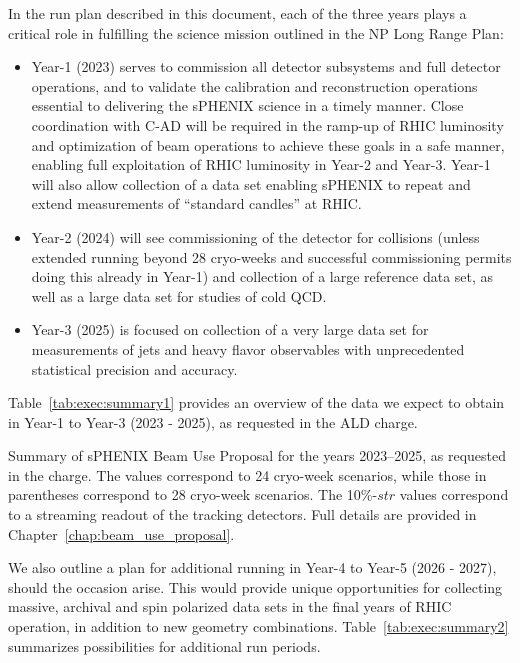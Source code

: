 In the run plan described in this document, each of the three years
plays a critical role in fulfilling the science mission outlined in
the NP Long Range Plan:
\begin{itemize}
\item Year-1 (2023) serves to commission all detector subsystems and full
  detector operations, and to validate the calibration and
  reconstruction operations essential to delivering the sPHENIX
  science in a timely manner. Close coordination with C-AD will be
  required in the ramp-up of RHIC luminosity and optimization of beam
  operations to achieve these goals in a safe manner, enabling full
  exploitation of RHIC luminosity in Year-2 and Year-3. Year-1 will
  also allow collection of a \auau data set enabling sPHENIX to repeat
  and extend measurements of ``standard candles'' at RHIC.
\item Year-2 (2024) will see commissioning of the detector for \pp collisions
  (unless extended running beyond 28 cryo-weeks and successful \auau
  commissioning permits doing this already in Year-1) and collection
  of a large \pp reference data set, as well as a large \pAu data set
  for studies of cold QCD.
\item Year-3 (2025) is focused on collection of a very large \auau
  data set for measurements of jets and heavy flavor observables with
  unprecedented statistical precision and accuracy.
\end{itemize}

Table~\ref{tab:exec:summary1} provides an overview of the data we
expect to obtain in Year-1 to Year-3 (2023 - 2025), as requested in the ALD charge.

\begin{table}[hbt!]
\centering
\caption{\label{tab:exec:summary1} Summary of sPHENIX Beam Use Proposal for the years
  2023--2025, as requested in the charge.  The values correspond to 24 cryo-week scenarios, while those in parentheses correspond to 28 cryo-week scenarios.    The 10\%-$str$ values correspond to a streaming readout of the tracking detectors.
  Full details are provided in
  Chapter~\ref{chap:beam_use_proposal}.} 
\bigskip \centering 
\end{table}

We also outline a plan for additional running in Year-4 to Year-5 (2026 - 2027), should the occasion
arise. This would provide unique opportunities for collecting massive,
archival \apa and spin polarized \pp data sets in the final years of
RHIC operation, in addition to new geometry combinations.  Table~\ref{tab:exec:summary2} summarizes possibilities for additional run periods.

